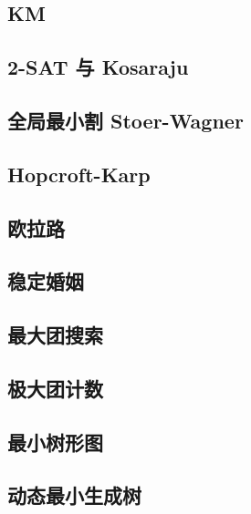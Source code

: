 \documentclass[10pt, a4paper]{article}
\begin{document}
  \subsection{KM}
    

  \subsection{2-SAT 与 Kosaraju}
    

  \subsection{全局最小割 Stoer-Wagner}
    

  \subsection{Hopcroft-Karp}
    

  \subsection{欧拉路}
    

  \subsection{稳定婚姻}
    

  \subsection{最大团搜索}
    
  
  \subsection{极大团计数}
    

  \subsection{最小树形图}
    

  \subsection{动态最小生成树}
    
\end{document}
